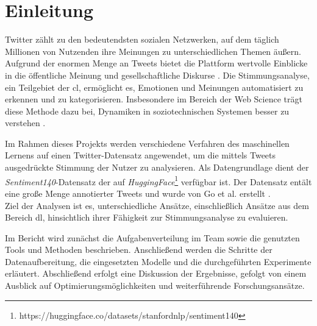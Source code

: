\section{Einleitung}

Twitter zählt zu den bedeutendsten sozialen Netzwerken, auf dem täglich Millionen von Nutzenden ihre Meinungen zu unterschiedlichen Themen äußern.
Aufgrund der enormen Menge an Tweets bietet die Plattform wertvolle Einblicke in die öffentliche Meinung und gesellschaftliche Diskurse \cite{pak2010twitter}.
Die Stimmungsanalyse, ein Teilgebiet der \gls{cl}, ermöglicht es, Emotionen und Meinungen automatisiert zu erkennen und zu kategorisieren.
Insbesondere im Bereich der Web Science trägt diese Methode dazu bei, Dynamiken in soziotechnischen Systemen besser zu verstehen \cite{berners2006web, liu2012sentiment}.

Im Rahmen dieses Projekts werden verschiedene Verfahren des maschinellen Lernens auf einen Twitter-Datensatz angewendet, um die mittels Tweets ausgedrückte Stimmung der Nutzer zu analysieren.
Als Datengrundlage dient der \textit{Sentiment140}-Datensatz der auf \textit{HuggingFace}\footnote{https://huggingface.co/datasets/stanfordnlp/sentiment140} verfügbar ist.
Der Datensatz entält eine große Menge annotierter Tweets und wurde von Go et al. erstellt \cite{go2009twitter}.\\
Ziel der Analysen ist es, unterschiedliche Ansätze, einschließlich Ansätze aus dem Bereich \gls{dl}, hinsichtlich ihrer Fähigkeit zur Stimmungsanalyse zu evaluieren.

Im Bericht wird zunächst die Aufgabenverteilung im Team sowie die genutzten Tools und Methoden beschrieben.
Anschließend werden die Schritte der Datenaufbereitung, die eingesetzten Modelle und die durchgeführten Experimente erläutert.
Abschließend erfolgt eine Diskussion der Ergebnisse, gefolgt von einem Ausblick auf Optimierungsmöglichkeiten und weiterführende Forschungsansätze.

